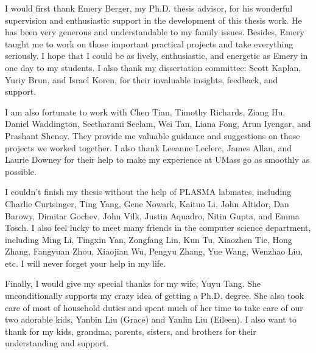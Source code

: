 I would first thank Emery Berger, my Ph.D. thesis advisor, for his wonderful supervision and enthusiastic support in the development of this thesis work. He has been very generous and understandable to my family issues. Besides, Emery taught me to work on those important practical projects and take everything seriously. I hope that I could be as lively, enthusiastic, and energetic as Emery in one day to my students.  I also thank my dissertation committee: Scott Kaplan, Yuriy Brun, and Israel Koren, for their invaluable insights, feedback, and support. 

I am also fortunate to work with Chen Tian, Timothy Richards, Ziang Hu, Daniel Waddington, Seetharami Seelam, Wei Tan, Liana Fong, Arun Iyengar, and Prashant Shenoy. They provide me valuable guidance and suggestions on those projects we worked together. I also thank Leeanne Leclerc, James Allan, and Laurie Downey for their help to make my experience at UMass go as smoothly as possible. 

I couldn't finish my thesis without the help of PLASMA  labmates, including Charlie Curtsinger, Ting Yang, Gene Nowark, Kaituo Li, John Altidor, Dan Barowy, Dimitar Gochev, John Vilk, Justin Aquadro,  Nitin Gupta, and Emma Tosch. I also feel lucky to meet many friends in the computer science department, including Ming Li, Tingxin Yan, Zongfang Lin, Kun Tu, Xiaozhen Tie, Hong Zhang, Fangyuan Zhou, Xiaojian Wu, Pengyu Zhang, Yue Wang, Wenzhao Liu, etc. I will never forget your help in my life. 

Finally, I would give my special thanks for my wife, Yuyu Tang. She unconditionally supports my crazy idea of getting a Ph.D. degree. She also took care of most of household duties and spent much of her time to take care of our two adorable kids, Yanbin Liu (Grace) and Yanlin Liu (Eileen). I also want to thank for my kids, grandma, parents, sisters, and brothers for their understanding and support.    

